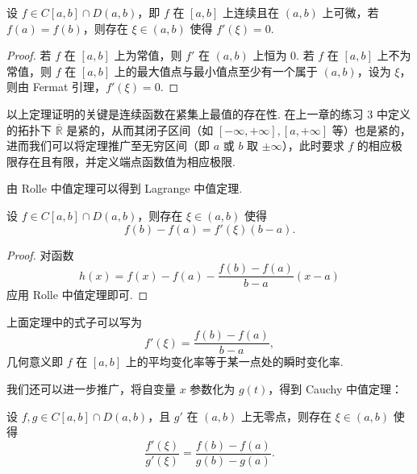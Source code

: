 \documentclass[../main.tex]{subfiles}
\begin{document}
\begin{theorem} 
    设 $f \in C[a, b] \cap D(a, b)$，即 $f$ 在 $[a, b]$ 上连续且在 $(a, b)$ 上可微，若 $f(a) = f(b)$，则存在 $\xi \in (a, b)$ 使得 $f'(\xi) = 0$. 
\end{theorem}

\begin{proof}
    若 $f$ 在 $[a, b]$ 上为常值，则 $f'$ 在 $(a, b)$ 上恒为 0. 若 $f$ 在 $[a, b]$ 上不为常值，则 $f$ 在 $[a, b]$ 上的最大值点与最小值点至少有一个属于 $(a, b)$，设为 $\xi$，则由 Fermat 引理，$f'(\xi) = 0$. 
\end{proof}

\begin{remark} \label{rem:Rolle}
    以上定理证明的关键是连续函数在紧集上最值的存在性. 在上一章的练习 3 中定义的拓扑下 $\overline{\mathbb R}$ 是紧的，从而其闭子区间（如 $[-\infty, +\infty], [a, +\infty]$ 等）也是紧的，进而我们可以将定理推广至无穷区间（即 $a$ 或 $b$ 取 $\pm\infty$），此时要求 $f$ 的相应极限存在且有限，并定义端点函数值为相应极限. 
\end{remark}

由 Rolle 中值定理可以得到 Lagrange 中值定理. 

\begin{theorem} 
    设 $f \in C[a, b] \cap D(a, b)$，则存在 $\xi \in (a, b)$ 使得 
    $$
    f(b) - f(a) = f'(\xi)(b - a). 
    $$
\end{theorem}

\begin{proof}
    对函数 
    $$
    h(x) = f(x) - f(a) - \frac{f(b) - f(a)}{b - a} (x - a)
    $$
    应用 Rolle 中值定理即可. 
\end{proof}

\begin{remark}
    上面定理中的式子可以写为 
    $$
    f'(\xi) = \frac{f(b) - f(a)}{b - a}, 
    $$
    几何意义即 $f$ 在 $[a, b]$ 上的平均变化率等于某一点处的瞬时变化率. 
\end{remark}

我们还可以进一步推广，将自变量 $x$ 参数化为 $g(t)$，得到 Cauchy 中值定理：

\begin{theorem} 
    设 $f, g \in C[a, b] \cap D(a, b)$，且 $g'$ 在 $(a, b)$ 上无零点，则存在 $\xi \in (a, b)$ 使得
    $$
    \frac{f'(\xi)}{g'(\xi)} = \frac{f(b) - f(a)}{g(b) - g(a)}. 
    $$
\end{theorem}
\end{document}
